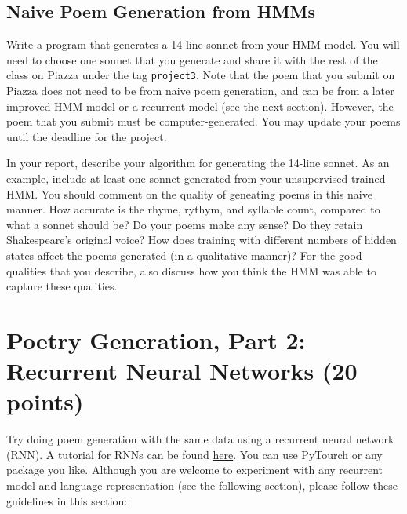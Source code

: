 \subsection{Naive Poem Generation from HMMs}
Write a program that generates a 14-line sonnet from your HMM model. You will need to choose one sonnet that you generate and share it with the rest of the class on Piazza under the tag {\tt project3}. Note that the poem that you submit on Piazza does not need to be from naive poem generation, and can be from a later improved HMM model or a recurrent model (see the next section). However, the poem that you submit must be computer-generated. You may update your poems until the deadline for the project.

\begin{report}
    In your report, describe your algorithm for generating the 14-line sonnet. As an example, include at least one sonnet generated from your unsupervised trained HMM. You should comment on the quality of geneating poems in this naive manner. How accurate is the rhyme, rythym, and syllable count, compared to what a sonnet should be? Do your poems make any sense? Do they retain Shakespeare's original voice? How does training with different numbers of hidden states affect the poems generated (in a qualitative manner)? For the good qualities that you describe, also discuss how you think the HMM was able to capture these qualities.
\end{report}

\section{Poetry Generation, Part 2: Recurrent Neural Networks (20 points)}
\label{sec:rnn}

Try doing poem generation with the same data using a recurrent neural network (RNN). A tutorial for RNNs can be found \href{https://pytorch.org/tutorials/intermediate/char_rnn_generation_tutorial.html}{here}. You can use PyTourch or any package you like. Although you are welcome to experiment with any recurrent model and language representation (see the following section), please follow these guidelines in this section:

